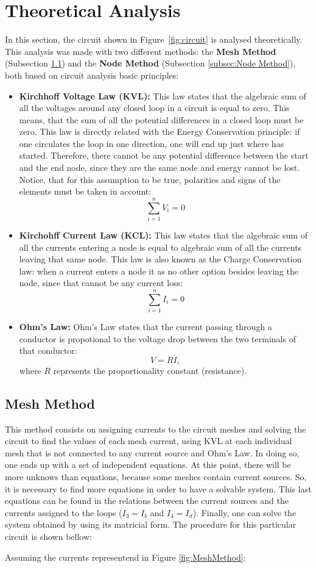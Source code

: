 \section{Theoretical Analysis}
\label{sec:analysis}

In this section, the circuit shown in Figure~\ref{fig:circuit} is analysed
theoretically. This analysis was made with two different methods: the \textbf{Mesh Method} (Subsection \ref{subsec:Mesh Method}) and the \textbf{Node Method} (Subsection \ref{subsec:Node Method}), both based on circuit analysis basic principles:
\begin{itemize}
\item \textbf{Kirchhoff Voltage Law (KVL):} This law states that the algebraic sum of all the voltages around any closed loop in a circuit is equal to zero. This means, that the sum of all the potential differences in a closed loop must be zero. This law is directly related with the Energy Conservation principle: if one circulates the loop in one direction, one will end up just where has started. Therefore, there cannot be any potential difference between the start and the end node, since they are the same node and energy cannot be lost. Notice, that for this assumption to be true, polarities and signs of the elements must be taken in account:$$\sum_{i=1}^{n}V_{i}=0$$
\item \textbf{Kirchohff Current Law (KCL):} This law states that the algebraic sum of all the currents entering a node is equal to algebraic sum of all the currents leaving that same node. This law is also known as the Charge Conservation law: when a current enters a node it as no other option besides leaving the node, since that cannot be any current loss: $$\sum_{i=1}^{n}I_{i}=0$$
  \item \textbf{Ohm's Law:} Ohm's Law states that the current passing through a conductor is propotional to the voltage drop between the two terminals of that conductor: $$V = RI,$$ where $R$ represents the proportionality constant (resistance). 
  
\end{itemize}


\subsection{Mesh Method}
\label{subsec:Mesh Method}\par
This method consists on assigning currents to the circuit meshes and solving the circuit to find the values of each mesh current, using KVL at each individual mesh that is not connected to any current source and Ohm's Law. In doing so, one ends up with a set of independent equations. At this point, there will be more unknows than equations, because some meshes contain current sources. So, it is necessary to find more equations in order to have a solvable system. This last equations can be found in the relations between the current sources and the currents assigned to the loops ($I_{3}=I_{b}$ and $I_{4}=I_{d}$). Finally, one can solve the system obtained by using its matricial form. The procedure for this particular circuit is shown bellow:\par
Assuming the currents representend in Figure \ref{fig:MeshMethod}:

